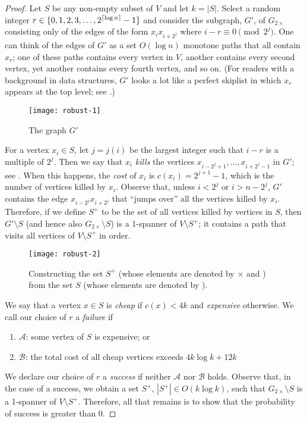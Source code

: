 \documentclass{sig-alternate}
\begin{document}
\begin{proof}
  Let $S$ be any non-empty subset of $V$ and let $k=|S|$.  Select a
  random integer $r\in\{0,1,2,3,\ldots,2^{{\lceil \log n \rceil}}-1\}$ and
  consider the subgraph, $G'$, of $G_{2\times}$ consisting only of
  the edges of the form $x_ix_{i+2^j}$ where $i-r\equiv 0\pmod{2^j}$.
  One can think of the edges of $G'$ as a set $O(\log n)$ monotone paths
  that all contain $x_r$; one of these paths contains every vertex in $V$,
  another contains every second vertex, yet another contains every fourth
  vertex, and so on.  (For readers with a background in data structures,
  $G'$ looks a lot like a perfect skiplist in which $x_r$
  appears at the top level; see .)

  \begin{figure*}
    \begin{center}
      \texttt{[image: robust-1]}
    \end{center}
    \caption{The graph $G'$}
  \end{figure*}

  For a vertex $x_i\in S$, let $j=j(i)$ be the largest integer such that
  $i-r$ is a multiple of $2^j$.  Then we say that $x_i$ \emph{kills}
  the vertices $x_{i-2^{j}+1},\ldots,x_{i+2^{j}-1}$ in $G'$; see
  .  When this happens, the \emph{cost} of $x_i$ is
  $c(x_i)=2^{j+1}-1$, which is the number of vertices killed by $x_i$.
  Observe that, unless $i<2^{j}$ or $i>n-2^{j}$, $G'$ contains the
  edge $x_{i-2^{j}}x_{i+2^{j}}$ that ``jumps over'' all the vertices
  killed by $x_i$.  Therefore, if we define $S^+$ to be the set of all
  vertices killed by vertices in $S$, then $G'\setminus S$ (and hence
  also $G_{2\times}\setminus S$) is a 1-spanner of $V\setminus S^+$; it
  contains a path that visits all vertices of $V\setminus S^+$ in order.
  
  \begin{figure*}
    \begin{center}
      \texttt{[image: robust-2]}
    \end{center}
    \caption{Constructing the set $S^+$ (whose elements are denoted
    by $\times$ and \textbullet)
      from the set $S$ (whose elements are denoted by \textbullet).}
  \end{figure*}
  
  We say that a vertex $x\in S$ is \emph{cheap} if $c(x) < 4k$ and
  \emph{expensive} otherwise.  We call our choice of $r$ a \emph{failure}
  if
  \begin{enumerate}
    \item $\mathcal{A}$: some vertex of $S$ is expensive; or
    \item $\mathcal{B}$: the total cost of all cheap vertices exceeds
      $4k\log k+12k$
  \end{enumerate}
  We declare our choice of $r$ a \emph{success} if neither
  $\mathcal{A}$ nor $\mathcal{B}$ holds.  Observe that, in the case
  of a success, we obtain a set $S^+$, $|S^+|\in O(k\log k)$, such that
  $G_{2\times}\setminus S$ is a 1-spanner of $V\setminus S^+$.  Therefore,
  all that remains is to show that the probability of success is greater
  than 0.
  

\end{proof}
\end{document}
